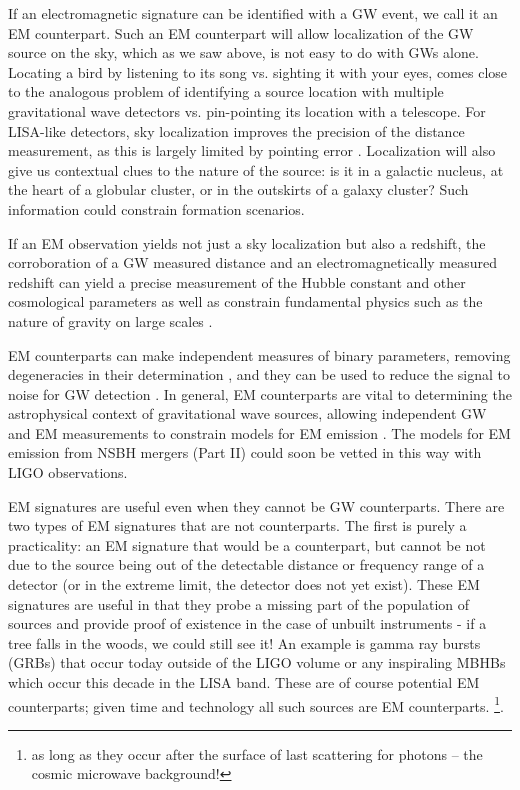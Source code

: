 If an electromagnetic signature can be identified with a GW event, we call it
an EM counterpart. Such an EM counterpart will allow localization of the GW
source on the sky, which as we saw above, is not easy to do with GWs alone.
Locating a bird by listening to its song vs. sighting it with your eyes, comes
close to the analogous problem of identifying a source location with multiple
gravitational wave detectors vs. pin-pointing its location with a telescope.
For LISA-like detectors, sky localization improves the
precision of the distance measurement, as this is largely limited by pointing
error \citep{Cutler:1998, Hughes:2002}. Localization will also give us contextual
clues to the nature of the source: is it in a galactic nucleus, at the heart
of a globular cluster, or in the outskirts of a galaxy cluster? Such
information could constrain formation scenarios.

If an EM observation yields not just a sky localization but also a redshift,
the corroboration of a GW measured distance and an electromagnetically
measured redshift can yield a precise measurement of the Hubble constant and
other cosmological parameters \citep{Schutz:1986, KrolakSchutz:1987,
ChernoffFinn:1993, Schutz:2002, HolzHughes:2005, Dalal:2006, Kocsis+2006,
Kocsis+2008, CutlerHolz:2009,  Nissanke:GRBStndSirens:2010, Nishizawa:StndSirens:2011, Taylor:StndSirens:2012,
Tamanini:2016} as well as constrain fundamental physics such as the nature of
gravity on large scales \citep{Deffayet:2007, Camera:StndSirens:2013}.

EM counterparts can make independent measures of binary parameters, removing
degeneracies in their determination \citep{HughesHolz:2003}, and they can be
used to reduce the signal to noise for GW detection \citep{KochanekPiran:1993,
HarryFairhurst:2011}. In general, EM counterparts are vital to determining the
astrophysical context of gravitational wave sources, allowing independent GW
and EM measurements to constrain models for EM emission \citep{Phinney:2009,
MandelO'Sh:2010}. The models for EM emission from NSBH mergers (Part II) could
soon be vetted in this way with LIGO observations.

EM signatures are useful even when they cannot be GW counterparts. There are
two types of EM signatures that are not counterparts. The first is  purely a
practicality: an EM signature that would be a counterpart, but cannot be not
due to the source being out of the detectable distance or frequency range of a
detector (or in the extreme limit, the detector does not yet exist). These EM
signatures are useful in that they probe a missing part of the population of
sources and provide proof of existence in the case of unbuilt instruments - if
a tree falls in the woods, we could still see it! An example is gamma ray
bursts (GRBs) that occur today outside of the LIGO volume or any inspiraling
MBHBs which occur this decade in the LISA band. These are of course potential
EM counterparts; given time and technology all such sources are EM
counterparts. \footnote{as long as they occur after the surface of last
scattering for photons -- the cosmic microwave background!}. %

